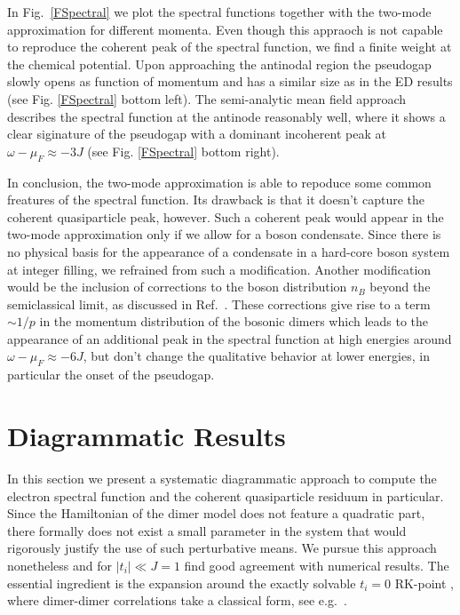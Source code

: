 \documentclass[aps,pra,reprint,showpacs,superscriptaddress]{revtex4-1}
\begin{document}
In Fig.~\ref{FSpectral} we plot the spectral functions together with the two-mode approximation for different momenta.
Even though this appraoch is not capable to reproduce the coherent peak of the spectral function, we find a finite weight at the chemical potential. Upon approaching the antinodal region the pseudogap slowly opens as function of momentum and has a similar size as in the ED results (see Fig. \ref{FSpectral} bottom left).
The semi-analytic mean field approach describes the spectral function at the antinode reasonably well, where it shows a clear siginature of the pseudogap with a dominant incoherent peak at $\omega-\mu_F \approx -3J$ (see Fig. \ref{FSpectral} bottom right).

In conclusion, the two-mode approximation is able to repoduce some common freatures of the spectral function. Its drawback is that it doesn't capture the coherent quasiparticle peak, however. Such a coherent peak would appear in the two-mode approximation only if we allow for a boson condensate. Since there is no physical basis for the appearance of a condensate in a hard-core boson system at integer filling, we refrained from such a modification.  Another modification would be the inclusion of corrections to the boson distribution $n_B$ beyond the semiclassical limit, as discussed in Ref.~\cite{coletta2012semiclassical}. These corrections give rise to a term $\sim1/p$ in the momentum distribution of the bosonic dimers which leads to the appearance of an additional peak in the spectral function at high energies around $\omega-\mu_F \approx -6J$, but don't change the qualitative behavior at lower energies, in particular the onset of the pseudogap.



\section{Diagrammatic Results}\label{DIAG}

In this section we present a systematic diagrammatic approach to compute the electron spectral function and the coherent quasiparticle residuum in particular. Since the Hamiltonian of the dimer model does not feature a quadratic part, there formally does not exist a small parameter in the system that would rigorously justify the use of such perturbative means. We pursue this approach nonetheless and for $|t_i|\ll J=1$ find good agreement with numerical results. The essential ingredient is the expansion around the exactly solvable $t_i=0$ RK-point \cite{rokhsar1988superconductivity}, where dimer-dimer correlations take a classical form, see e.g.~\cite{fisher1963statistical}.
\end{document}
